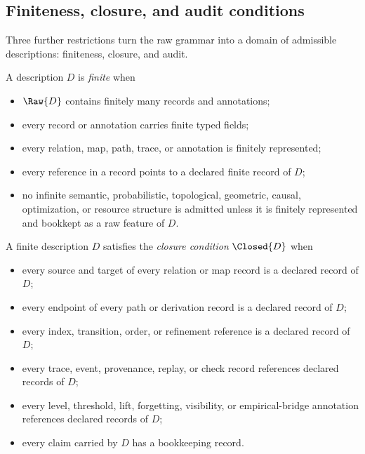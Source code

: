 \subsection{Finiteness, closure, and audit conditions}\label{subsec:conditions}

Three further restrictions turn the raw grammar into a domain of
admissible descriptions: finiteness, closure, and audit.

\begin{definition}\label{def:finite}
A description \(D\) is \emph{finite} when
\begin{itemize}[topsep=2pt,itemsep=1pt]
  \item \(\Raw{D}\) contains finitely many records and annotations;
  \item every record or annotation carries finite typed fields;
  \item every relation, map, path, trace, or annotation is finitely
    represented;
  \item every reference in a record points to a declared finite record of
    \(D\);
  \item no infinite semantic, probabilistic, topological, geometric, causal,
    optimization, or resource structure is admitted unless it is finitely
    represented and bookkept as a raw feature of \(D\).
\end{itemize}
\end{definition}

\begin{definition}\label{def:closed}
A finite description \(D\) satisfies the \emph{closure condition} \(\Closed{D}\)
when
\begin{itemize}[topsep=2pt,itemsep=1pt]
  \item every source and target of every relation or map record is a declared
    record of \(D\);
  \item every endpoint of every path or derivation record is a declared record
    of \(D\);
  \item every index, transition, order, or refinement reference is a declared
    record of \(D\);
  \item every trace, event, provenance, replay, or check record references
    declared records of \(D\);
  \item every level, threshold, lift, forgetting, visibility, or
    empirical-bridge annotation references declared records of \(D\);
  \item every claim carried by \(D\) has a bookkeeping record.
\end{itemize}
\end{definition}

